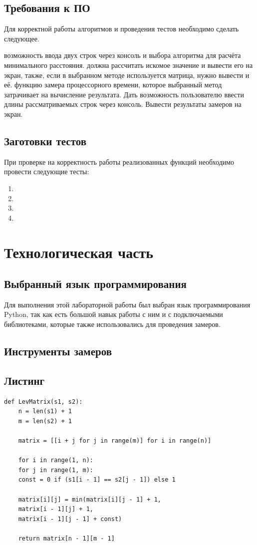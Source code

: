 \documentclass[12pt]{report}
\begin{document}
\section{Требования к ПО}
Для корректной работы алгоритмов и проведения тестов необходимо сделать следующее.
\begin{enumerate}
	 возможность ввода двух строк через консоль и выбора алгоритма для расчёта минимального расстояния.
	 должна рассчитать искомое значение и вывести его на экран, также, если в выбранном методе используется матрица, нужно вывести и её.
	 функцию замера процессорного времени, которое выбранный метод затрачивает на вычисление результата. Дать возможность пользователю ввести длины рассматриваемых строк через консоль. Вывести результаты замеров на экран.
	\end{enumerate}

\section{Заготовки тестов}
При проверке на корректность работы реализованных функций необходимо провести следующие тесты:
\begin{enumerate}
	 строки пустые;
	 одна из строк пустая;
	 совпадающие строки;
	\item
	\item
	\item\item
\end{enumerate}

\chapter{Технологическая часть}
\section{Выбранный язык программирования}
Для выполнения этой лабораторной работы был выбран язык программирования Python, так как есть большой навык работы с ним и с подключаемыми библиотеками, которые также использовались для проведения замеров.
\section{Инструменты замеров}
\section{Листинг}
\begin{lstlisting}[label=some-code, caption = Матричный алгоритм нахождения расстояния Левенштейна]
def LevMatrix(s1, s2):
	n = len(s1) + 1
	m = len(s2) + 1
	
	matrix = [[i + j for j in range(m)] for i in range(n)]
	
	for i in range(1, n):
	for j in range(1, m):
	const = 0 if (s1[i - 1] == s2[j - 1]) else 1
	
	matrix[i][j] = min(matrix[i][j - 1] + 1,
	matrix[i - 1][j] + 1,
	matrix[i - 1][j - 1] + const)
	
	return matrix[n - 1][m - 1]
	
	\end{lstlisting}
\end{document}
